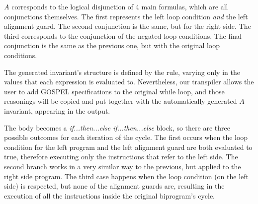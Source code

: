 $A$ corresponds to the logical disjunction of 4 main formulas, which are all conjunctions themselves.
The first represents the left loop condition \emph{and} the left alignment guard.
The second conjunction is the same, but for the right side.
The third corresponds to the conjunction of the negated loop conditions.
The final conjunction is the same as the previous one, but with the original loop conditions.

The generated invariant's structure is defined by the rule, varying only in the values that each expression is evaluated to.
Nevertheless, our transpiler allows the user to add GOSPEL specifications to the original while loop, and those reasonings will be copied and put together with the automatically generated $A$ invariant, appearing in the output.

The body becomes a \emph{if...then...else if...then...else} block, so there are three possible outcomes for each iteration of the cycle.
The first occurs when the loop condition for the left program and the left alignment guard are both evaluated to true, therefore executing only the instructions that refer to the left side.
The second branch works in a very similar way to the previous, but applied to the right side program.
The third case happens when the loop condition (on the left side) is respected, but none of the alignment guards are, resulting in the execution of all the instructions inside the original biprogram's cycle.
